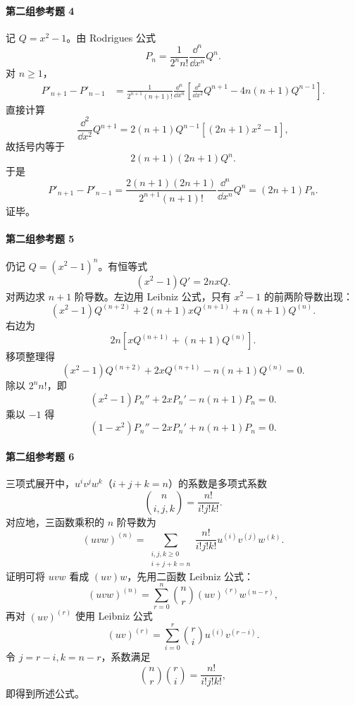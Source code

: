 \paragraph{第二组参考题 4}
\begin{xsolution}
记 $Q=x^2-1$。由 Rodrigues 公式
\[
  P_n=\frac1{2^nn!}\frac{\dd^n}{\dd x^n}Q^n.
\]
对 $n\ge1$，
\begin{align*}
  P'_{n+1}-P'_{n-1}
  &=\frac1{2^{n+1}(n+1)!}\frac{\dd^n}{\dd x^n}
  \left[\frac{\dd^2}{\dd x^2}Q^{n+1}-4n(n+1)Q^{n-1}\right].
\end{align*}
直接计算
\[
  \frac{\dd^2}{\dd x^2}Q^{n+1}
  =2(n+1)Q^{n-1}[(2n+1)x^2-1],
\]
故括号内等于
\[
  2(n+1)(2n+1)Q^n.
\]
于是
\[
  P'_{n+1}-P'_{n-1}
  =\frac{2(n+1)(2n+1)}{2^{n+1}(n+1)!}
   \frac{\dd^n}{\dd x^n}Q^n
  =(2n+1)P_n.
\]
证毕。
\end{xsolution}

\paragraph{第二组参考题 5}
\begin{xsolution}
仍记 $Q=(x^2-1)^n$。有恒等式
\[
  (x^2-1)Q'=2nxQ.
\]
对两边求 $n+1$ 阶导数。左边用 Leibniz 公式，只有 $x^2-1$ 的前两阶导数出现：
\[
  (x^2-1)Q^{(n+2)}+2(n+1)xQ^{(n+1)}+n(n+1)Q^{(n)}.
\]
右边为
\[
  2n\left[xQ^{(n+1)}+(n+1)Q^{(n)}\right].
\]
移项整理得
\[
  (x^2-1)Q^{(n+2)}+2xQ^{(n+1)}-n(n+1)Q^{(n)}=0.
\]
除以 $2^nn!$，即
\[
  (x^2-1)P_n''+2xP_n'-n(n+1)P_n=0.
\]
乘以 $-1$ 得
\[
  \boxed{(1-x^2)P_n''-2xP_n'+n(n+1)P_n=0}.
\]
\end{xsolution}

\paragraph{第二组参考题 6}
\begin{xsolution}
三项式展开中，$u^iv^jw^k$（$i+j+k=n$）的系数是多项式系数
\[
  \binom{n}{i,j,k}=\frac{n!}{i!j!k!}.
\]
对应地，三函数乘积的 $n$ 阶导数为
\[
  \boxed{
  (uvw)^{(n)}
  =\sum_{\substack{i,j,k\ge0\\i+j+k=n}}
  \frac{n!}{i!j!k!}
  u^{(i)}v^{(j)}w^{(k)}}.
\]
证明可将 $uvw$ 看成 $(uv)w$，先用二函数 Leibniz 公式：
\[
  (uvw)^{(n)}=\sum_{r=0}^n\binom nr(uv)^{(r)}w^{(n-r)},
\]
再对 $(uv)^{(r)}$ 使用 Leibniz 公式
\[
  (uv)^{(r)}=\sum_{i=0}^r\binom ri u^{(i)}v^{(r-i)}.
\]
令 $j=r-i,k=n-r$，系数满足
\[
  \binom nr\binom ri=\frac{n!}{i!j!k!},
\]
即得到所述公式。
\end{xsolution}

